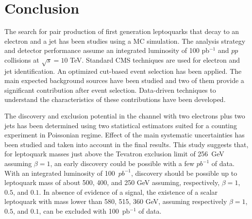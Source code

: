 %

\section{Conclusion}

The search for pair production of first generation leptoquarks that decay to
an electron and a jet has been studies using a MC simulation.
The analysis strategy and detector performance assume an integrated luminosity of 100 pb$^{-1}$ and $pp$ collisions 
at $\sqrt{s}=10$ TeV.
Standard CMS techniques are used for electron and jet identification. 
An optimized cut-based event selection has been applied.
The main expected background sources have been studied and two of them provide 
a significant contribution after event selection. 
Data-driven techniques to understand the characteristics of these contributions have been developed.

The discovery and exclusion potential in the channel with two electrons plus two jets has 
been determined using two statistical estimators suited for a counting experiment in Poissonian regime.
Effect of the main systematic uncertainties has been studied and taken into account in the final 
results. This study suggests that, 
for leptoquark masses just above the Tevatron exclusion limit of 256~GeV assuming $\beta=1$, 
an early discovery could be possible with a few $pb^{-1}$ of data.
With an integrated luminosity of 100~$pb^{-1}$, discovery should be possible up
to leptoquark mass of about 500, 400, and 250 GeV assuming, respectively, 
$\beta=1$, $0.5$, and $0.1$. 
In absence of evidence of a signal, the existence of a scalar leptoquark 
with mass lower than 580, 515, 360 GeV, assuming respectively 
$\beta=1$, $0.5$, and $0.1$, can be excluded with 100~pb$^{-1}$ of data.




%
